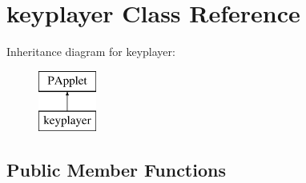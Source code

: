 \hypertarget{classkeyplayer}{\section{keyplayer Class Reference}
\label{classkeyplayer}
}
Inheritance diagram for keyplayer\+:\begin{figure}[H]
\begin{center}
\leavevmode
\includegraphics[height=2.000000cm]{classkeyplayer}
\end{center}
\end{figure}
\subsection*{Public Member Functions}
